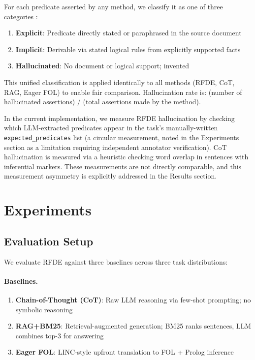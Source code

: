 \documentclass[11pt,letterpaper]{article}
\begin{document}
For each predicate asserted by any method, we classify it as one of three categories \citep{Olausson2023}:

\begin{enumerate}
  \item \textbf{Explicit}: Predicate directly stated or paraphrased in the source document
  \item \textbf{Implicit}: Derivable via stated logical rules from explicitly supported facts
  \item \textbf{Hallucinated}: No document or logical support; invented
\end{enumerate}

This unified classification is applied identically to all methods (RFDE, CoT, RAG, Eager FOL) to enable fair comparison.
Hallucination rate is: (number of hallucinated assertions) / (total assertions made by the method).

In the current implementation, we measure RFDE hallucination by checking which LLM-extracted predicates appear in the
task's manually-written \texttt{expected\_predicates} list (a circular measurement, noted in the Experiments section as a
limitation requiring independent annotator verification). CoT hallucination is measured via a heuristic checking word
overlap in sentences with inferential markers. These measurements are not directly comparable, and this measurement
asymmetry is explicitly addressed in the Results section.

\section{Experiments}

\subsection{Evaluation Setup}

We evaluate RFDE against three baselines across three task distributions:

\paragraph{Baselines.}
\begin{enumerate}
  \item \textbf{Chain-of-Thought (CoT)}: Raw LLM reasoning via few-shot prompting; no symbolic reasoning
  \item \textbf{RAG+BM25}: Retrieval-augmented generation; BM25 ranks sentences, LLM combines top-3 for answering
  \item \textbf{Eager FOL}: LINC-style upfront translation to FOL + Prolog inference
\end{enumerate}
\end{document}
